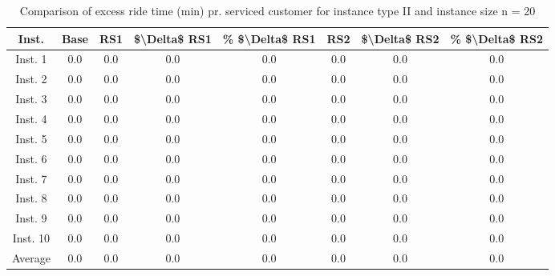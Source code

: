 \begin{table}[H]
\centering
\begin{tabular}{cccccccc}
  \hline
  \textbf{Inst.} & \textbf{Base} & \textbf{RS1} & \textbf{\$\textbackslash{}Delta\$  RS1} & \textbf{\% \$\textbackslash{}Delta\$  RS1} & \textbf{RS2} & \textbf{\$\textbackslash{}Delta\$  RS2} & \textbf{\% \$\textbackslash{}Delta\$  RS2} \\\hline
  Inst. 1 & 0.0 & 0.0 & 0.0 & 0.0 & 0.0 & 0.0 & 0.0 \\
  Inst. 2 & 0.0 & 0.0 & 0.0 & 0.0 & 0.0 & 0.0 & 0.0 \\
  Inst. 3 & 0.0 & 0.0 & 0.0 & 0.0 & 0.0 & 0.0 & 0.0 \\
  Inst. 4 & 0.0 & 0.0 & 0.0 & 0.0 & 0.0 & 0.0 & 0.0 \\
  Inst. 5 & 0.0 & 0.0 & 0.0 & 0.0 & 0.0 & 0.0 & 0.0 \\
  Inst. 6 & 0.0 & 0.0 & 0.0 & 0.0 & 0.0 & 0.0 & 0.0 \\
  Inst. 7 & 0.0 & 0.0 & 0.0 & 0.0 & 0.0 & 0.0 & 0.0 \\
  Inst. 8 & 0.0 & 0.0 & 0.0 & 0.0 & 0.0 & 0.0 & 0.0 \\
  Inst. 9 & 0.0 & 0.0 & 0.0 & 0.0 & 0.0 & 0.0 & 0.0 \\
  Inst. 10 & 0.0 & 0.0 & 0.0 & 0.0 & 0.0 & 0.0 & 0.0 \\
  Average & 0.0 & 0.0 & 0.0 & 0.0 & 0.0 & 0.0 & 0.0 \\\hline
\end{tabular}
\caption{Comparison of excess ride time (min) pr. serviced customer for instance type II and instance size n = 20}
\label{tab:wait:resrelocation-excess-ride-time-comparison_II_20}
\end{table}
